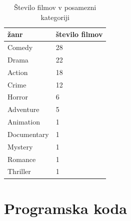 \documentclass[a4paper,11pt]{article}
\begin{document}
\begin{table}[htbp]
\caption{Število filmov v posamezni kategoriji}
\label{tab4}
\begin{center}
\begin{tabular}{lp{2cm}}
\hline
žanr & število filmov \\
\hline

Comedy      & 28 \\  
Drama       & 22 \\  
Action      & 18 \\  
Crime       & 12 \\  
Horror      &  6 \\  
Adventure   &  5 \\  
Animation   &  1 \\  
Documentary &  1 \\  
Mystery     &  1 \\  
Romance     &  1 \\  
Thriller    &  1 \\ 
\hline
\end{tabular}
\end{center}
\end{table}

\section{\label{app-code}Programska koda}






\end{document}
